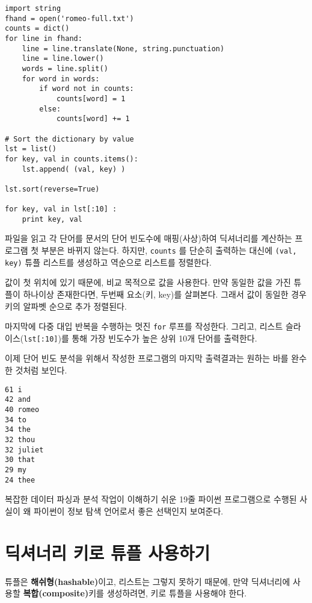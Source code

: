 \beforeverb
\begin{verbatim}
import string
fhand = open('romeo-full.txt')
counts = dict()
for line in fhand:
    line = line.translate(None, string.punctuation)
    line = line.lower()
    words = line.split()
    for word in words:
        if word not in counts:
            counts[word] = 1
        else:
            counts[word] += 1

# Sort the dictionary by value
lst = list()
for key, val in counts.items():
    lst.append( (val, key) )

lst.sort(reverse=True)

for key, val in lst[:10] :
    print key, val
\end{verbatim}
\afterverb
%

파일을 읽고 각 단어를 문서의 단어 빈도수에 매핑(사상)하여 딕셔너리를 계산하는 프로그램 첫 부분은 바뀌지 않는다.
하지만, {\tt counts} 를 단순히 출력하는 대신에 {\tt (val, key)} 튜플 리스트를 생성하고 역순으로 리스트를 정렬한다.

값이 첫 위치에 있기 때문에, 비교 목적으로 값을 사용한다. 
만약 동일한 값을 가진 튜플이 하나이상 존재한다면, 두번째 요소(키, key)를 살펴본다.
그래서 값이 동일한 경우 키의 알파벳 순으로 추가 정렬된다.

마지막에 다중 대입 반복을 수행하는 멋진 {\tt for} 루프를 작성한다. 
그리고, 리스트 슬라이스({\tt lst[:10]})를 통해 가장 빈도수가 높은 상위 10개 단어를 출력한다.

이제 단어 빈도 분석을 위해서 작성한 프로그램의 마지막 출력결과는 원하는 바를 완수한 것처럼 보인다.

\beforeverb
\begin{verbatim}
61 i
42 and
40 romeo
34 to
34 the
32 thou
32 juliet
30 that
29 my
24 thee
\end{verbatim}
\afterverb
%

복잡한 데이터 파싱과 분석 작업이 이해하기 쉬운 19줄 파이썬 프로그램으로 수행된 사실이 왜 파이썬이 정보 탐색 언어로서 좋은 선택인지 보여준다.

\section{ 딕셔너리 키로 튜플 사용하기}


튜플은 {\bf 해쉬형(hashable)}이고, 리스트는 그렇지 못하기 때문에, 만약 딕셔너리에 사용할 {\bf 복합(composite)}키를 생성하려면, 키로 튜플을 사용해야 한다.

